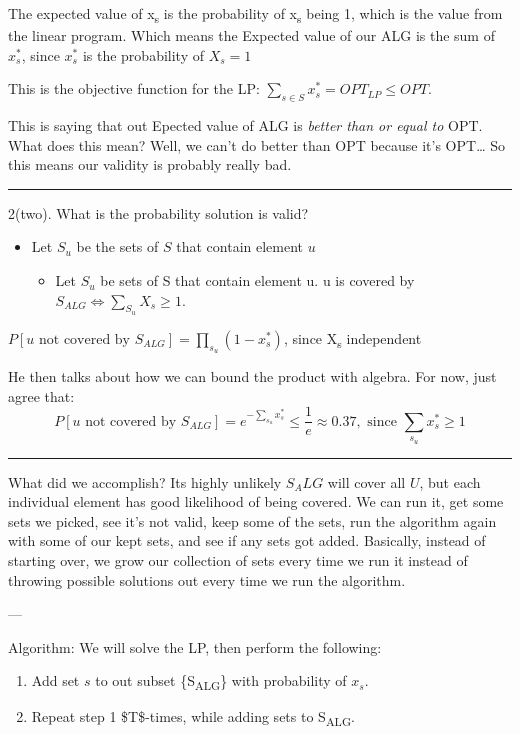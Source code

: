 \documentclass[11pt]{article}
\begin{document}
The expected value of x\textsubscript{s} is the probability of x\textsubscript{s} being 1, which is the value from the linear program. Which means the Expected value of our ALG is the sum of \(x_s^*\), since \(x_s^*\) is the probability of \(X_s =1\)

This is the objective function for the LP: \(\sum_{s \in S} x_s^* = OPT_{LP} \leq OPT\).

This is saying that out Epected value of ALG is \emph{better than or equal to} OPT. What does this mean? Well, we can't do better than OPT because it's OPT\ldots{} So this means our validity is probably really bad.

\noindent\rule{\textwidth}{0.5pt}
2(two). What is the probability solution is valid?
\begin{itemize}
\item Let \(S_u\) be the sets of \(S\) that contain element \(u\)
\begin{itemize}
\item Let \(S_u\) be sets of S that contain element u. u is covered by \(S_{ALG} \iff \sum_{S_u} X_s \geq 1\).
\end{itemize}
\end{itemize}

\(P[u \text{ not covered by } S_{ALG}] = \prod_{s_u} (1-x_s^*)\), since X\textsubscript{s} independent

He then talks about how we can bound the product with algebra. For now, just agree that:
\[ P[u \text{ not covered by } S_{ALG}] = e^{-\sum_{s_u} x_s^*} \leq \frac{1}{e} \approx 0.37, \text{ since } \sum_s_u x_s^* \geq 1  \]

\noindent\rule{\textwidth}{0.5pt}

What did we accomplish? Its highly unlikely \(S_ALG\) will cover all \(U\), but each individual element has good likelihood of being covered. We can run it, get some sets we picked, see it's not valid, keep some of the sets, run the algorithm again with some of our kept sets, and see if any sets got added. Basically, instead of starting over, we grow our collection of sets every time we run it instead of throwing possible solutions out every time we run the algorithm.

---

Algorithm:
We will solve the LP, then perform the following:
\begin{enumerate}
\item Add set \(s\) to out subset \{S\textsubscript{ALG}\} with probability of \(x_s\).
\item Repeat step 1 \$T\$-times, while adding sets to S\textsubscript{ALG}.
\end{enumerate}
\end{document}
